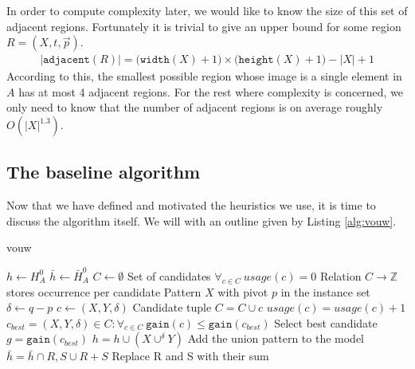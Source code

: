 \documentclass{llncs}
\begin{document}
In order to compute complexity later, we would like to know the size of this set of adjacent regions. Fortunately it is trivial to give an upper bound for some region $R=(X,t,\vec{p})$.
\begin{align}
	|\mathtt{adjacent}(R)| = \big(\mathtt{width}(X)+1\big) \times \big(\mathtt{height}(X)+1\big) - |X| + 1
\end{align}
According to this, the smallest possible region whose image is a single element in $A$ has at most 4 adjacent regions. For the rest where complexity is concerned, we only need to know that the number of adjacent regions is on average roughly $O(|X|^{1.3})$.

\subsection{The baseline algorithm}

Now that we have defined and motivated the heuristics we use, it is time to discuss the algorithm itself. We will with an outline given by Listing \ref{alg:vouw}.

\begin{algorithm}
\caption{vouw}
\label{alg:vouw}
\begin{algorithmic}
\State $h \gets H_A^0$
\State $\bar{h} \gets \bar{H}_A^0$
\Repeat
	\State $C \gets \emptyset$ 
		\Comment Set of candidates
	\State $\forall_{c\in C} \ {usage}(c) = 0$
		\Comment Relation $C \to \mathbb{Z}$ stores occurrence per candidate
		\Comment Pattern $X$ with pivot $p$ in the instance set
		\State $\delta \gets q-p$
		\State $c \gets (X,Y,\delta)$
			\Comment Candidate tuple
		\State $C = C \cup c$
		\State ${usage}(c) = {usage}(c) + 1$ 
		\EndFor
	\EndFor	
	\State $c_{best} = (X,Y,\delta) \in C : \forall_{c \in C} \ \mathtt{gain}(c) \leq \mathtt{gain}(c_{best})$
		\Comment Select best candidate
	\State $g = \mathtt{gain}(c_{best})$
		\State $h = h \cup (X \cup^\delta Y)$
			\Comment Add the union pattern to the model
				\State $\bar{h} = \bar{h} \cap R,S \cup R+S$
					\Comment Replace R and S with their sum
			\EndFor
		\EndFor
	\EndIf
{}

\end{algorithmic}
\end{algorithm} 
\end{document}
